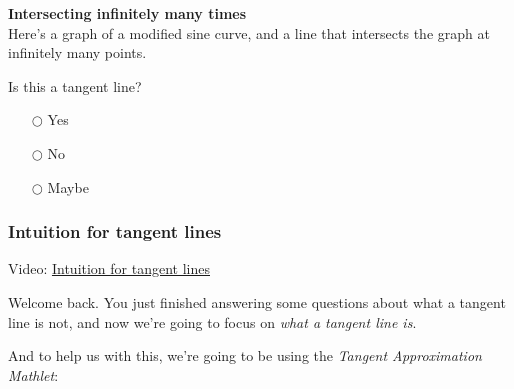 \documentclass[pdftex, brazil, 12pt, twoside]{article}
\begin{document}
\begin{exercise}
  \textbf{Intersecting infinitely many times}\\%
  Here's a graph of a modified sine curve, and a line that intersects the graph
  at infinitely many points.
  \begin{figure}[H]
    \begin{center}
    \end{center}
  \end{figure}
  Is this a tangent line?
  \begin{itemize}[noitemsep]
  \item[$\bigcirc$] Yes
  \item[$\bigcirc$] No
  \item[$\bigcirc$] Maybe
  \end{itemize}
\end{exercise}

\subsubsection{Intuition for tangent lines}
\label{u1-geometric-intuition-for-tangent}

Video: \href{https://www.youtube.com/watch?v=Bon3jzROwqU}{Intuition for tangent lines}

Welcome back.
You just finished answering some questions about what a tangent
line is not, and now we're going to focus
on \emph{what a tangent line is}.

And to help us with this, we're going
to be using the \emph{Tangent Approximation Mathlet}:
\end{document}
